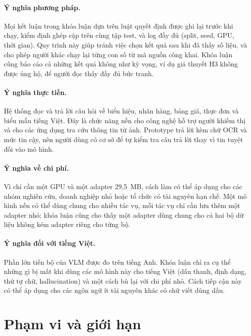 \paragraph{Ý nghĩa phương pháp.} Mọi kết luận trong khóa luận dựa trên luật
quyết định được ghi lại trước khi chạy, kiểm định ghép cặp trên cùng tập test,
và log đầy đủ (split, seed, GPU, thời gian). Quy trình này giúp tránh việc chọn
kết quả sau khi đã thấy số liệu, và cho phép người khác chạy lại từng con số từ
mã nguồn công khai. Khóa luận cũng báo cáo cả những kết quả không như kỳ vọng,
ví dụ giả thuyết H3 không được ủng hộ, để người đọc thấy đầy đủ bức tranh.

\paragraph{Ý nghĩa thực tiễn.} Hệ thống đọc và trả lời câu hỏi về biển hiệu,
nhãn hàng, bảng giá, thực đơn và biểu mẫu tiếng Việt. Đây là chức năng nền cho
công nghệ hỗ trợ người khiếm thị và cho các ứng dụng tra cứu thông tin từ ảnh.
Prototype trả lời kèm chữ OCR và mức tin cậy, nên người dùng có cơ sở để tự kiểm
tra câu trả lời thay vì tin tuyệt đối vào mô hình.

\paragraph{Ý nghĩa về chi phí.} Vì chỉ cần một GPU và một adapter 29,5~MB, cách
làm có thể áp dụng cho các nhóm nghiên cứu, doanh nghiệp nhỏ hoặc tổ chức có tài
nguyên hạn chế. Một mô hình nền có thể dùng chung cho nhiều tác vụ, mỗi tác vụ
chỉ cần lưu thêm một adapter nhỏ; khóa luận cũng cho thấy một adapter dùng chung
cho cả hai bộ dữ liệu không kém adapter riêng cho từng bộ.

\paragraph{Ý nghĩa đối với tiếng Việt.} Phần lớn tiến bộ của VLM được đo trên
tiếng Anh. Khóa luận chỉ ra cụ thể những gì bị mất khi dùng các mô hình này cho
tiếng Việt (dấu thanh, định dạng, thứ tự chữ, hallucination) và một cách bù lại
với chi phí nhỏ. Cách tiếp cận này có thể áp dụng cho các ngôn ngữ ít tài nguyên
khác có chữ viết dùng dấu.

\section{Phạm vi và giới hạn}
\label{sec:intro-scope}

